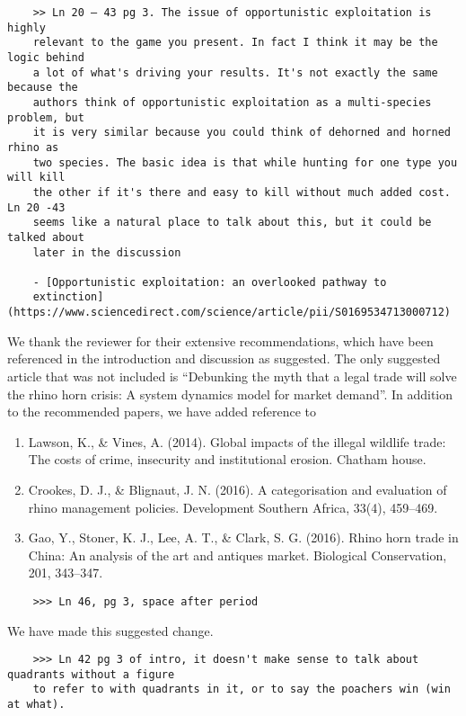 \documentclass[10pt]{article}
\begin{document}
\begin{verbatim}
    >> Ln 20 – 43 pg 3. The issue of opportunistic exploitation is highly
    relevant to the game you present. In fact I think it may be the logic behind
    a lot of what's driving your results. It's not exactly the same because the
    authors think of opportunistic exploitation as a multi-species problem, but
    it is very similar because you could think of dehorned and horned rhino as
    two species. The basic idea is that while hunting for one type you will kill
    the other if it's there and easy to kill without much added cost.  Ln 20 -43
    seems like a natural place to talk about this, but it could be talked about
    later in the discussion

    - [Opportunistic exploitation: an overlooked pathway to
    extinction](https://www.sciencedirect.com/science/article/pii/S0169534713000712)
\end{verbatim}

We thank the reviewer for their extensive recommendations, which have been referenced
in the introduction and discussion as suggested. The only suggested article that was
not included is ``Debunking the myth that a legal trade will solve the rhino horn crisis:
A system dynamics model for market demand''. In addition to the recommended papers,
we have added reference to 

\begin{enumerate}
\item Lawson, K., \& Vines, A. (2014). Global impacts of the illegal wildlife trade: The costs of crime, insecurity and institutional erosion. Chatham house.

\item Crookes, D. J., \& Blignaut, J. N. (2016). A categorisation and evaluation of rhino management policies. Development Southern Africa, 33(4), 459--469.

\item Gao, Y., Stoner, K. J., Lee, A. T., \& Clark, S. G. (2016). Rhino horn trade in China: An analysis of the art and antiques market. Biological Conservation, 201, 343--347.
\end{enumerate}

\begin{verbatim}
    >>> Ln 46, pg 3, space after period
\end{verbatim}

We have made this suggested change.

\begin{verbatim}
    >>> Ln 42 pg 3 of intro, it doesn't make sense to talk about quadrants without a figure
    to refer to with quadrants in it, or to say the poachers win (win at what).
\end{verbatim}
\end{document}
